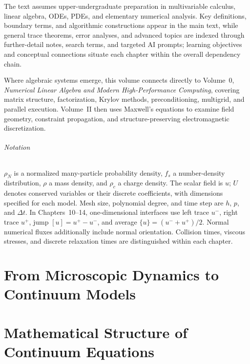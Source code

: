 \documentclass[11pt,openany]{book}
\begin{document}
The text assumes upper-undergraduate preparation in multivariable calculus, linear algebra, ODEs, PDEs, and elementary numerical analysis. Key definitions, boundary terms, and algorithmic constructions appear in the main text, while general trace theorems, error analyses, and advanced topics are indexed through further-detail notes, search terms, and targeted AI prompts; learning objectives and conceptual connections situate each chapter within the overall dependency chain.

Where algebraic systems emerge, this volume connects directly to Volume~0, \emph{Numerical Linear Algebra and Modern High-Performance Computing}, covering matrix structure, factorization, Krylov methods, preconditioning, multigrid, and parallel execution. Volume~II then uses Maxwell's equations to examine field geometry, constraint propagation, and structure-preserving electromagnetic discretization.

\paragraph{Notation}
$\rho_N$ is a normalized many-particle probability density, $f_s$ a number-density distribution, $\rho$ a mass density, and $\rho_c$ a charge density. The scalar field is $u$; $U$ denotes conserved variables or their discrete coefficients, with dimensions specified for each model. Mesh size, polynomial degree, and time step are $h$, $p$, and $\Delta t$. In Chapters~10--14, one-dimensional interfaces use left trace $u^-$, right trace $u^+$, jump $[u]=u^+-u^-$, and average $\{u\}=(u^-+u^+)/2$. Normal numerical fluxes additionally include normal orientation. Collision times, viscous stresses, and discrete relaxation times are distinguished within each chapter.

\tableofcontents
\mainmatter
\part{From Microscopic Dynamics to Continuum Models}




\part{Mathematical Structure of Continuum Equations}





\end{document}
